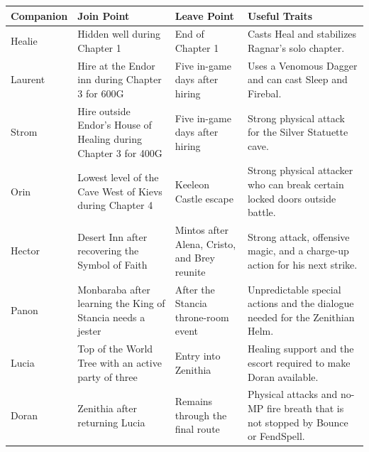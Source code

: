 \documentclass[
  american,
  10pt,
  letterpaper,
  oneside,
  open=any]{scrreprt}
\newcounter{none} %
\newenvironment{guidetable}{%
  \small\setstretch{1.0}%
  \setlength{\tabcolsep}{4pt}%
  \setlength{\LTpre}{8pt}\setlength{\LTpost}{10pt}%
  \renewcommand{\arraystretch}{1.16}%
}{ }
\begin{document}
\begin{guidetable}

{\def\LTcaptype{none} %
\begin{longtable}[]{@{}
  >{\raggedright\arraybackslash}p{}
  >{\raggedright\arraybackslash}p{}
  >{\raggedright\arraybackslash}p{}
  >{\raggedright\arraybackslash}p{}@{}}
\toprule\noalign{}
\begin{minipage}[b]{\linewidth}\raggedright
\color{GuideGreen}\bfseries Companion
\end{minipage} & \begin{minipage}[b]{\linewidth}\raggedright
\color{GuideGreen}\bfseries Join Point
\end{minipage} & \begin{minipage}[b]{\linewidth}\raggedright
\color{GuideGreen}\bfseries Leave Point
\end{minipage} & \begin{minipage}[b]{\linewidth}\raggedright
\color{GuideGreen}\bfseries Useful Traits
\end{minipage} \\
\midrule\noalign{}
\endhead
\bottomrule\noalign{}
\endlastfoot
Healie & Hidden well during Chapter 1 & End of Chapter 1 & Casts Heal
and stabilizes Ragnar's solo chapter. \\
Laurent & Hire at the Endor inn during Chapter 3 for 600G & Five in-game
days after hiring & Uses a Venomous Dagger and can cast Sleep and
Firebal. \\
Strom & Hire outside Endor's House of Healing during Chapter 3 for 400G
& Five in-game days after hiring & Strong physical attack for the Silver
Statuette cave. \\
Orin & Lowest level of the Cave West of Kievs during Chapter 4 & Keeleon
Castle escape & Strong physical attacker who can break certain locked
doors outside battle. \\
Hector & Desert Inn after recovering the Symbol of Faith & Mintos after
Alena, Cristo, and Brey reunite & Strong attack, offensive magic, and a
charge-up action for his next strike. \\
Panon & Monbaraba after learning the King of Stancia needs a jester &
After the Stancia throne-room event & Unpredictable special actions and
the dialogue needed for the Zenithian Helm. \\
Lucia & Top of the World Tree with an active party of three & Entry into
Zenithia & Healing support and the escort required to make Doran
available. \\
Doran & Zenithia after returning Lucia & Remains through the final route
& Physical attacks and no-MP fire breath that is not stopped by Bounce
or FendSpell. \\
\end{longtable}
}

\end{guidetable}
\end{document}
